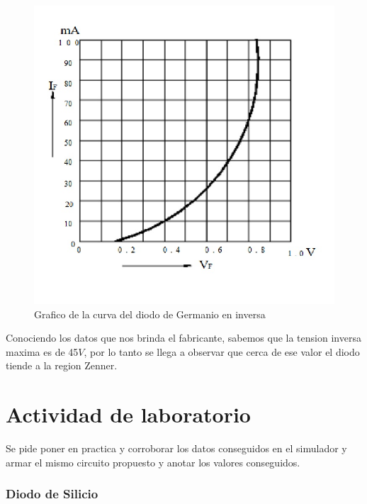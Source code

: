\documentclass[chaptersright]{informeutn}
\begin{document}
                        \begin{figure}[!h]
                            \centering
                            \begin{minipage}[b]{0.4\textwidth}
                                \includegraphics[width=1.1\linewidth]{pictures/Curva_Datash_Ge.jpg}
                                \caption{Grafico de la curva del diodo de Germanio en inversa}
                            \end{minipage}
                        \end{figure}

                        Conociendo los datos que nos brinda el fabricante, sabemos que la tension inversa maxima es de 45$V$, por lo tanto se llega a observar que cerca de ese valor el diodo tiende a la region Zenner.

    \chapter{Actividad de laboratorio}
    
        Se pide poner en practica y corroborar los datos conseguidos en el simulador y armar el mismo circuito propuesto y anotar los valores conseguidos.
        
        \subsection{Diodo de Silicio}
        
\end{document}
